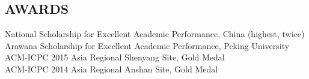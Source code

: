 \documentclass[margin]{res}
\newcommand{\Bullet}[1]{{\raisebox{0.25ex}{\tiny$\bullet$\ }}{#1}\\}
\begin{document}
\begin{resume}
\section{AWARDS}
    \Bullet{National Scholarship for Excellent Academic Performance, China (highest, twice)}
    \Bullet{Arawana Scholarship for Excellent Academic Performance, Peking University}
    \Bullet{ACM-ICPC 2015 Asia Regional Shenyang Site, Gold Medal}
    \Bullet{ACM-ICPC 2014 Asia Regional Anshan Site, Gold Medal}

%
%
%


\end{resume}
\end{document}
